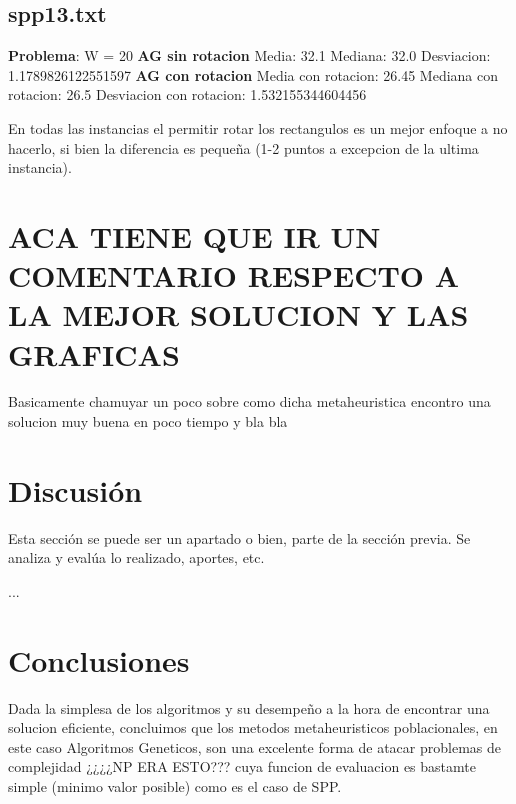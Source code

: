 \documentclass[10pt]{article}
\begin{document}
\subsection*{spp13.txt}
\noindent \textbf{Problema}: W = 20 \newline
[(7, 5), (1, 8), (5, 9), (9, 3), (2, 16), (9, 7), (5, 9), (5, 3), (4, 9), (3, 7), (2, 7), (9, 3), (2, 16)]\newline
\newline
\textbf{AG sin rotacion}\newline 
Media: 32.1\newline
Mediana: 32.0\newline
Desviacion: 1.1789826122551597\newline
\newline
\textbf{AG con rotacion}\newline
Media con rotacion: 26.45\newline
Mediana con rotacion: 26.5\newline
Desviacion con rotacion: 1.532155344604456\newline

En todas las instancias el permitir rotar los rectangulos es un mejor enfoque a no hacerlo, si bien la diferencia es pequeña (1-2 puntos a excepcion de la ultima instancia).

\section{ACA TIENE QUE IR UN COMENTARIO RESPECTO A LA MEJOR SOLUCION Y LAS GRAFICAS}
Basicamente chamuyar un poco sobre como dicha metaheuristica encontro una solucion muy buena en poco tiempo y bla bla

\section{Discusión}
Esta sección se puede ser un apartado o bien, parte de la sección previa. Se analiza y evalúa lo realizado, aportes, etc.

 
...


\section{Conclusiones}
Dada la simplesa de los algoritmos y su desempeño a la hora de encontrar una solucion eficiente, concluimos que los metodos metaheuristicos poblacionales, en este caso Algoritmos Geneticos, son una excelente forma de atacar problemas de complejidad ¿¿¿¿NP ERA ESTO??? cuya funcion de evaluacion es bastamte simple (minimo valor posible) como es el caso de SPP.
\end{document}

